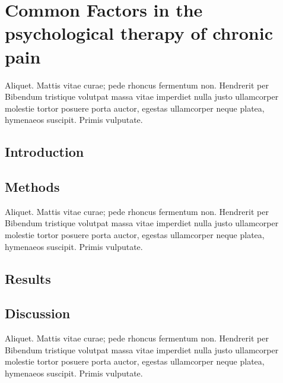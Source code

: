 

\chapter{\label{ch:2-litreview} Common Factors in the psychological therapy of chronic pain}

Aliquet. Mattis vitae curae; pede rhoncus fermentum non. Hendrerit per Bibendum tristique volutpat massa vitae imperdiet nulla justo ullamcorper molestie tortor posuere porta auctor, egestas ullamcorper neque platea, hymenaeos suscipit. Primis vulputate. 

\section{Introduction}
\section{Methods}

Aliquet. Mattis vitae curae; pede rhoncus fermentum non. Hendrerit per Bibendum tristique volutpat massa vitae imperdiet nulla justo ullamcorper molestie tortor posuere porta auctor, egestas ullamcorper neque platea, hymenaeos suscipit. Primis vulputate. \cite{pmid:23742793}

\section{Results}
\section{Discussion}

Aliquet. Mattis vitae curae; pede rhoncus fermentum non. Hendrerit per Bibendum tristique volutpat massa vitae imperdiet nulla justo ullamcorper molestie tortor posuere porta auctor, egestas ullamcorper neque platea, hymenaeos suscipit. Primis vulputate. 